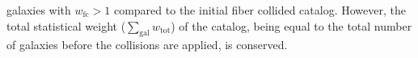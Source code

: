                                                                                                                                                                                                                                                                          galaxies with $w_\mathrm{fc} > 1$ compared to the initial fiber collided catalog.
                                                                                                                                                                                                                                                                         However, the total statistical weight ($\sum_\mathrm{gal} w_\mathrm{tot}$) of 
                                                                                                                                                                                                                                                                         the catalog, being equal to the total number of galaxies before the collisions
                                                                                                                                                                                                                                                                         are applied, is conserved. 

